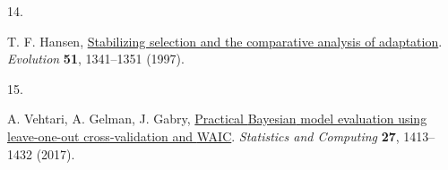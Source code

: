\documentclass[
  letterpaper,
  DIV=11,
  numbers=noendperiod]{scrartcl}
\newlength{\cslhangindent}
\newlength{\csllabelwidth}
\newenvironment{CSLReferences}[2] %
 {\begin{list}{}{%
  \setlength{\itemindent}{0pt}
  \setlength{\leftmargin}{0pt}
  \setlength{\parsep}{0pt}
  \ifodd #1
   \setlength{\leftmargin}{\cslhangindent}
   \setlength{\itemindent}{-1\cslhangindent}
  \fi
  \setlength{\itemsep}{#2\baselineskip}}}
 {\end{list}}
\newcommand{\CSLLeftMargin}[1]{\parbox[t]{\csllabelwidth}{\strut#1\strut}}
\newcommand{\CSLRightInline}[1]{\parbox[t]{\linewidth - \csllabelwidth}{\strut#1\strut}}
\begin{document}
\begin{CSLReferences}{0}{1}
\CSLLeftMargin{14. }%
\CSLRightInline{T. F. Hansen,
\href{https://doi.org/10.1111/j.1558-5646.1997.tb01457.x}{Stabilizing
selection and the comparative analysis of adaptation}. \emph{Evolution}
\textbf{51}, 1341--1351 (1997).}

\CSLLeftMargin{15. }%
\CSLRightInline{A. Vehtari, A. Gelman, J. Gabry,
\href{https://doi.org/10.1007/s11222-016-9696-4}{Practical {Bayesian}
model evaluation using leave-one-out cross-validation and {WAIC}}.
\emph{Statistics and Computing} \textbf{27}, 1413--1432 (2017).}

\end{CSLReferences}
\end{document}
